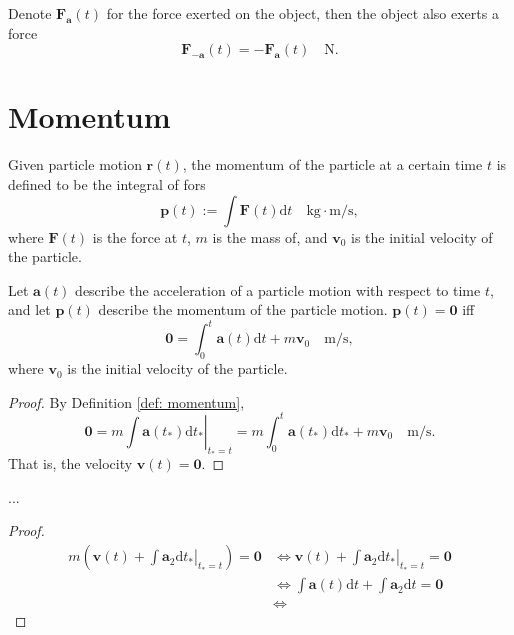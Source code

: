 Denote $\mathbf F_{\mathbf a}(t)$ for the force exerted on the object, then the object also exerts a force
\begin{equation}
	\mathbf F_{- \mathbf a}(t) = - \mathbf F_{\mathbf a}(t) \quad \mathrm{N}.
\end{equation}





\section{Momentum}


\begin{definition}
	\label{def: momentum}
	Given particle motion $\mathbf r(t)$, the momentum of the particle at a certain time $t$ is defined to be the integral of fors
	$$
	\mathbf p(t) := \int \mathbf F(t) \mathrm dt \quad \mathrm{kg \cdot m/s},
	$$
	where $\mathbf F(t)$ is the force at $t$, $m$ is the mass of, and $\mathbf v_0$ is the initial velocity of the particle.
\end{definition}


\begin{proposition}
	\label{prop: momentum: zero}
	Let $\mathbf a(t)$ describe the acceleration of a particle motion with respect to time $t$, and let $\mathbf p(t)$ describe the momentum of the particle motion. $\mathbf p(t) = \mathbf 0$ iff
	$$
	\mathbf 0 = \int_{0}^{t} \mathbf a(t) \mathrm d t + m \mathbf v_0 \quad \mathrm{m/s},
	$$
	where $\mathbf v_0$ is the initial velocity of the particle.
	
	\begin{proof}
		By Definition \ref{def: momentum},
		$$
		\mathbf 0 = m \left. \int \mathbf a(t_*) \mathrm d t_* \right|_{t_* = t} = m \int_{0}^{t} \mathbf a(t_*) \mathrm d t_* + m \mathbf v_0 \quad \mathrm{m/s}.
		$$
		That is, the velocity $\mathbf v(t) = \mathbf 0$.
	\end{proof}
\end{proposition}


\begin{proposition}
	...

	\begin{proof}
		$$
		\begin{aligned}
			m \left( \mathbf v(t) + \left. \int \mathbf a_2 \mathrm d t_* \right|_{t_* = t} \right) = \mathbf 0 &\iff \mathbf v(t) + \left. \int \mathbf a_2 \mathrm d t_* \right|_{t_* = t} = \mathbf 0 \\
			&\iff \int \mathbf a(t) \mathrm d t + \int \mathbf a_2 \mathrm d t = \mathbf 0 \\
			&\iff 
		\end{aligned}
		$$
	\end{proof}
\end{proposition}



